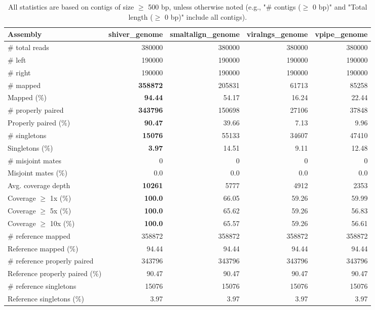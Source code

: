 \documentclass[12pt,a4paper]{article}
\begin{document}
\begin{table}[ht]
\begin{center}
\caption{All statistics are based on contigs of size $\geq$ 500 bp, unless otherwise noted (e.g., "\# contigs ($\geq$ 0 bp)" and "Total length ($\geq$ 0 bp)" include all contigs).}
\begin{tabular}{|l*{4}{|r}|}
\hline
Assembly & shiver\_genome & smaltalign\_genome & viralngs\_genome & vpipe\_genome \\ \hline
\# total reads & 380000 & 380000 & 380000 & 380000 \\ \hline
\# left & 190000 & 190000 & 190000 & 190000 \\ \hline
\# right & 190000 & 190000 & 190000 & 190000 \\ \hline
\# mapped & {\bf 358872} & 205831 & 61713 & 85258 \\ \hline
Mapped (\%) & {\bf 94.44} & 54.17 & 16.24 & 22.44 \\ \hline
\# properly paired & {\bf 343796} & 150698 & 27106 & 37848 \\ \hline
Properly paired (\%) & {\bf 90.47} & 39.66 & 7.13 & 9.96 \\ \hline
\# singletons & {\bf 15076} & 55133 & 34607 & 47410 \\ \hline
Singletons (\%) & {\bf 3.97} & 14.51 & 9.11 & 12.48 \\ \hline
\# misjoint mates & 0 & 0 & 0 & 0 \\ \hline
Misjoint mates (\%) & 0.0 & 0.0 & 0.0 & 0.0 \\ \hline
Avg. coverage depth & {\bf 10261} & 5777 & 4912 & 2353 \\ \hline
Coverage $\geq$ 1x (\%) & {\bf 100.0} & 66.05 & 59.26 & 59.99 \\ \hline
Coverage $\geq$ 5x (\%) & {\bf 100.0} & 65.62 & 59.26 & 56.83 \\ \hline
Coverage $\geq$ 10x (\%) & {\bf 100.0} & 65.57 & 59.26 & 56.61 \\ \hline
\# reference mapped & 358872 & 358872 & 358872 & 358872 \\ \hline
Reference mapped (\%) & 94.44 & 94.44 & 94.44 & 94.44 \\ \hline
\# reference properly paired & 343796 & 343796 & 343796 & 343796 \\ \hline
Reference properly paired (\%) & 90.47 & 90.47 & 90.47 & 90.47 \\ \hline
\# reference singletons & 15076 & 15076 & 15076 & 15076 \\ \hline
Reference singletons (\%) & 3.97 & 3.97 & 3.97 & 3.97 \\ \hline

\end{tabular}
\end{center}
\end{table}
\end{document}
